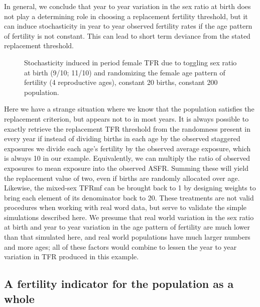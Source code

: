 \documentclass[reqno,12pt,oneside,a4paper]{report} %
\theoremstyle{plain}
\theoremstyle{definition}
\theoremstyle{remark}
\numberwithin{theorem}{chapter}     %
\begin{document}
In general, we conclude that year to year variation in the sex ratio at birth does not play a determining role in choosing a replacement fertility threshold, but it can induce stochasticity in year to year observed fertility rates if the age pattern of fertility is not constant. This can lead to short term deviance from the stated replacement threshold.

\begin{figure}
\begin{center}


{\tikzexternaldisable

}

\end{center}
\caption{Stochasticity induced in period female TFR due to toggling sex ratio at birth (9/10; 11/10) and randomizing the female age pattern of fertility (4 reproductive ages), constant 20 births, constant 200 population.}
\label{fig:two}
\end{figure}

Here we have a strange situation where we know that the population satisfies the replacement criterion, but appears not to in most years. It is always possible to exactly retrieve the replacement TFR threshold from the randomness present in every year if instead of dividing births in each age by the observed staggered exposures we divide each age's fertility by the observed average exposure, which is always 10 in our example. Equivalently, we can multiply the ratio of observed exposures to mean exposure into the observed ASFR. Summing these will yield the replacement value of two, even if births are randomly allocated over age. Likewise, the mixed-sex TFRmf can be brought back to 1 by designing weights to bring each element of its denominator back to 20. These treatments are not valid procedures when working with real word data, but serve to validate the simple simulations described here. We presume that real world variation in the sex ratio at birth and year to year variation in the age pattern of fertility are much lower than that simulated here, and real world populations have much larger numbers and more ages; all of these factors would combine to lessen the year to year variation in TFR produced in this example.

	\subsection{A fertility indicator for the population as a whole}
\end{document}
